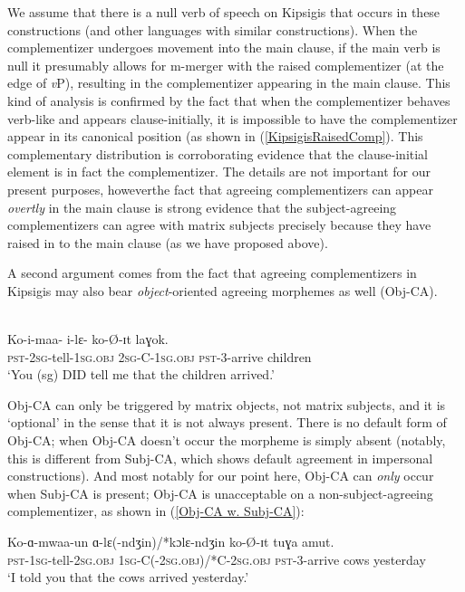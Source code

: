 \documentclass[output=paper
,modfonts
,nonflat
]{langsci/langscibook}
\begin{document}
We assume that there is a null verb of speech on Kipsigis that occurs in these constructions (and other languages with similar constructions). When the complementizer undergoes movement into the main clause, if the main verb is null it presumably allows for m-merger with the raised complementizer (at the edge of \textit{v}P), resulting in the complementizer appearing in the main clause. This kind of analysis is confirmed by the fact that when the complementizer behaves verb-like and appears clause-initially, it is impossible to have the complementizer appear in its canonical position (as shown in (\ref{KipsigisRaisedComp}). This complementary distribution is corroborating evidence that the clause-initial element is in fact the complementizer. The details are not important for our present purposes, however\textemdash the fact that agreeing complementizers can appear \textit{overtly} in the main clause is strong evidence that the subject-agreeing complementizers can agree with matrix subjects precisely because they have raised in to the main clause (as we have proposed above).  

A second argument comes from the fact that agreeing complementizers in Kipsigis may also bear \textit{object}-oriented agreeing morphemes as well (Obj-CA). 

\ea \label{ObjCAExample} 
\\
\gll Ko-i-maa- i-lɛ- ko-\O-ɪt laɣok. \\
\textsc{pst}-2\textsc{sg}-tell-1\textsc{sg}.\textsc{obj} 2\textsc{sg}-C-1\textsc{sg}.\textsc{obj} \textsc{pst}-3-arrive children \\ 
\glt `You (sg) DID tell me that the children arrived.'
\z

\noindent Obj-CA can only be triggered by matrix objects, not matrix subjects, and it is `optional' in the sense that it is not always present. There is no default form of Obj-CA; when Obj-CA doesn't occur the morpheme is simply absent (notably, this is different from Subj-CA, which shows default agreement in impersonal constructions). And most notably for our point here, Obj-CA can \textit{only} occur when Subj-CA is present; Obj-CA is unacceptable on a non-subject-agreeing complementizer, as shown in (\ref{Obj-CA w. Subj-CA}): 

\ea \label{Obj-CA w. Subj-CA}
\gll Ko-ɑ-mwaa-un ɑ-lɛ(-ndʒin)/*kɔlɛ-ndʒin ko-\O-ɪt tuɣa amut. \\
\textsc{pst}-1\textsc{sg}-tell-2\textsc{sg}.\textsc{obj} 1\textsc{sg}-C(-2\textsc{sg}.\textsc{obj})/*C-2\textsc{sg}.\textsc{obj} \textsc{pst}-3-arrive cows yesterday \\
\glt `I told you that the cows arrived yesterday.'
\z
\end{document}

